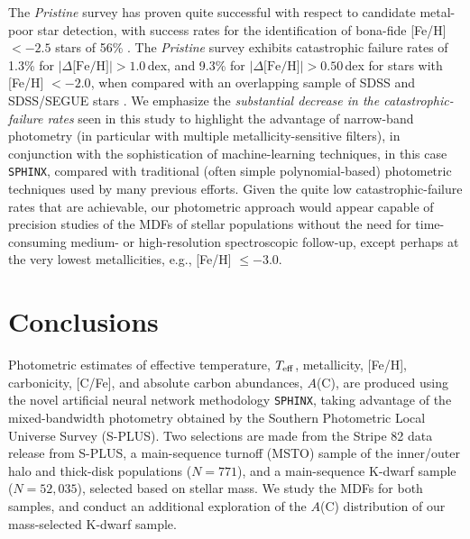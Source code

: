 \documentclass[twocolumn,trackchanges]{aastex63}
\begin{document}

The \textit{Pristine} survey has proven quite successful with respect to candidate metal-poor star detection, with success rates for the identification of bona-fide [Fe/H] $<-2.5$ stars of 56\% \citep{Aguado:2019}. The \textit{Pristine} survey exhibits catastrophic failure rates of 1.3\% for $| \Delta \textrm{[Fe/H]} | > 1.0$\,dex, and 9.3\% for $| \Delta \textrm{[Fe/H]} | > 0.50$\,dex for stars with [Fe/H] $<-2.0$, when compared with an overlapping sample of SDSS and SDSS/SEGUE stars \citep[calculations based on data from][]{Starkenburg:2017}.
%
We emphasize the {\it substantial decrease in the 
catastrophic-failure rates} seen in this study to highlight the advantage of narrow-band photometry (in particular with multiple metallicity-sensitive filters), in conjunction with the sophistication of machine-learning techniques, in this case \texttt{SPHINX}, compared with traditional (often simple polynomial-based) photometric techniques used by many previous efforts. Given the quite low catastrophic-failure rates that are achievable, our photometric approach would appear capable of precision studies of the MDFs of stellar populations without the need for time-consuming medium- or high-resolution spectroscopic follow-up, except perhaps at the very lowest metallicities, e.g., [Fe/H] $\leq -3.0$.

\section{Conclusions}\label{section:conclusions}

Photometric estimates of effective temperature, $T_{\rm eff}$, metallicity, [Fe/H], carbonicity, [C/Fe], and absolute carbon abundances, $A$(C), are produced using the  novel artificial neural network methodology \texttt{SPHINX}, taking advantage of the mixed-bandwidth photometry obtained by the Southern Photometric Local Universe Survey (S-PLUS). Two selections are made from the Stripe 82 data release from S-PLUS, a main-sequence turnoff (MSTO) sample of the inner/outer halo and thick-disk populations ($N=771$), and a main-sequence K-dwarf sample ($N=52,035$), selected based on stellar mass. We study the MDFs for both samples, and conduct an additional exploration of the $A$(C) distribution of our mass-selected K-dwarf sample. 
\end{document}
